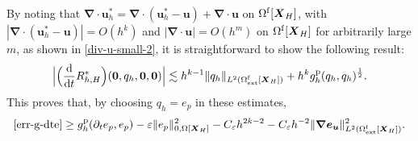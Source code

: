 \documentclass[11pt,reqno]{amsart}
\theoremstyle{definition}
\theoremstyle{plain}
\numberwithin{theorem}{section}
\numberwithin{proposition}{section}
\numberwithin{lemma}{section}
\numberwithin{equation}{section}
\newcommand{\bs}[1]{\boldsymbol{#1}}
\newcommand{\uu}[1]  {{\bs{#1}} }
\newcommand{\grad}   { \uu{\nabla}    }
\def\d{\mathrm{d}}
\renewcommand{\(}{\bigl(}
\renewcommand{\)}{\bigr)}
\begin{document}
By noting that $\grad\cdot{\bs u}_h^* = \grad\cdot({\bs u}_h^*-{\bs u}) + \grad\cdot {\bs u}$ on $\Omega^{\rm f}[{\bs X}_H]$, with $|\grad\cdot({\bs u}_h^*-{\bs u})|=O(h^k)$ and $|\grad\cdot{\bs u}|=O(h^m)$ on $\Omega^{\rm f}[{\bs X}_H]$ for arbitrarily large $m$, as shown in \eqref{div-u-small-2}, it is straightforward to show the following result:   
\begin{align}
\Big| \Big(\frac{\d}{\d t} R_{h,H}^*\Big) (\bs 0, q_h, \bs 0, \bs 0) \Big|
\lesssim h^{k-1}\|q_h\|_{L^2(\Omega^{\rm f}_{\rm ext}[{\bs X}_H])} 
+ h^kg^{\rm p}_h(q_h,q_h)^{\frac12} . 
\end{align}
This proves that, by choosing $q_h=e_p$ in these estimates, 
\begin{align}\label{dteq-div-eu-estimates}
\eqref{err-g-dte}
\ge g_h^{\rm p} (\partial_t e_p, e_p) 
- \varepsilon \|e_p\|_{0,\Omega[{\bs X}_H]}^2 
- C_{\varepsilon}h^{2k-2} 
- C_{\varepsilon}h^{-2}\|\grad{\bs e}_{\bs u}\|_{L^2(\Omega^{\rm f}_{\rm ext}[{\bs X}_H])}^2 . 
\end{align}
\end{document}
